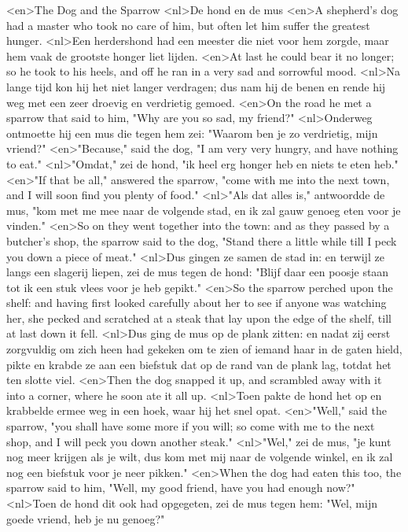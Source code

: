<en>The Dog and the Sparrow
<nl>De hond en de mus
<en>A shepherd’s dog had a master who took no care of him, but often let him suffer the greatest hunger.
<nl>Een herdershond had een meester die niet voor hem zorgde, maar hem vaak de grootste honger liet lijden.
<en>At last he could bear it no longer; so he took to his heels, and off he ran in a very sad and sorrowful mood.
<nl>Na lange tijd kon hij het niet langer verdragen; dus nam  hij de benen en rende hij weg met een zeer droevig en verdrietig gemoed.
<en>On the road he met a sparrow that said to him, "Why are you so sad, my friend?"
<nl>Onderweg ontmoette hij een mus die tegen hem zei: "Waarom ben je zo verdrietig, mijn vriend?"
<en>"Because," said the dog, "I am very very hungry, and have nothing to eat."
<nl>"Omdat," zei de hond, "ik heel erg honger heb en niets te eten heb."
<en>"If that be all," answered the sparrow, "come with me into the next town, and I will soon find you plenty of food."
<nl>"Als dat alles is," antwoordde de mus, "kom met me mee naar de volgende stad, en ik zal gauw  genoeg eten voor je vinden."
<en>So on they went together into the town: and as they passed by a butcher’s shop, the sparrow said to the dog, "Stand there a little while till I peck you down a piece of meat."
<nl>Dus gingen ze samen de stad in: en terwijl ze langs een slagerij liepen, zei de mus tegen de hond: "Blijf daar een poosje staan tot ik een stuk vlees voor je heb gepikt."
<en>So the sparrow perched upon the shelf: and having first looked carefully about her to see if anyone was watching her, she pecked and scratched at a steak that lay upon the edge of the shelf, till at last down it fell.
<nl>Dus ging de mus op de plank zitten: en nadat zij eerst zorgvuldig om zich heen had gekeken om te zien of iemand haar in de gaten hield, pikte  en krabde ze aan een biefstuk dat op de rand van de plank lag, totdat het ten slotte viel.
<en>Then the dog snapped it up, and scrambled away with it into a corner, where he soon ate it all up.
<nl>Toen pakte de hond het op en krabbelde ermee weg in een hoek, waar hij het snel opat.
<en>"Well," said the sparrow, "you shall have some more if you will; so come with me to the next shop, and I will peck you down another steak."
<nl>"Wel," zei de mus, "je kunt nog meer krijgen als je wilt, dus kom met mij naar de volgende winkel, en ik zal nog een biefstuk voor je neer pikken."
<en>When the dog had eaten this too, the sparrow said to him, "Well, my good friend, have you had enough now?"
<nl>Toen de hond dit ook had opgegeten, zei de mus tegen hem: "Wel, mijn goede vriend, heb je nu genoeg?"
